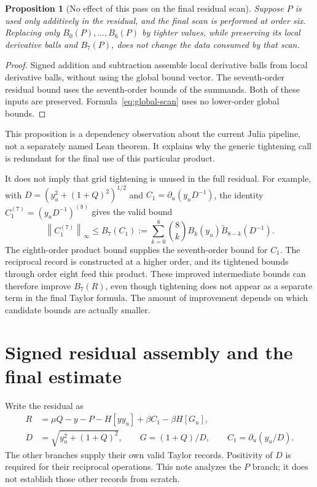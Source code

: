 \documentclass[11pt]{article}
\newtheorem{proposition}[theorem]{Proposition}
\theoremstyle{definition}
\theoremstyle{remark}
\newcommand{\norminf}[1]{\left\|#1\right\|_{\infty}}
\numberwithin{equation}{section}
\begin{document}
\begin{proposition}[No effect of this pass on the final residual scan]
\label{prop:no-effect}
Suppose $P$ is used only additively in the residual, and the final scan is
performed at order six. Replacing only $B_0(P),\ldots,B_6(P)$ by tighter
values, while preserving its local derivative balls and $B_7(P)$, does not
change the data consumed by that scan.
\end{proposition}
\begin{proof}
Signed addition and subtraction assemble local derivative balls from local
derivative balls, without using the global bound vector. The seventh-order
residual bound uses the seventh-order bounds of the summands. Both of these
inputs are preserved. Formula~\eqref{eq:global-scan} uses no lower-order
global bounds.
\end{proof}
This proposition is a dependency observation about the current Julia
pipeline, not a separately named Lean theorem. It explains why the generic
tightening call is redundant for the final use of this particular product.

It does not imply that grid tightening is unused in the full residual.
For example, with $D=(y_u^2+(1+Q)^2)^{1/2}$ and
$C_1=\partial_u(y_uD^{-1})$, the identity
$C_1^{(7)}=(y_uD^{-1})^{(8)}$ gives the valid bound
\begin{equation}
 \norminf{C_1^{(7)}}\leq B_7(C_1):=
 \sum_{k=0}^{8}\binom{8}{k}B_k(y_u)\widetilde B_{8-k}(D^{-1}).
 \label{eq:upstream-tightening}
\end{equation}
The eighth-order product bound supplies the seventh-order bound for
$C_1$. The reciprocal record
is constructed at a higher order, and its tightened bounds through order
eight feed this product. These improved intermediate bounds can therefore
improve $B_7(R)$, even though tightening does not appear as a separate term
in the final Taylor formula. The amount of improvement depends on which
candidate bounds are actually smaller.

\section{Signed residual assembly and the final estimate}
\label{sec:residual}

Write the residual as
\begin{align}
 R&=\mu Q-y-P-H[yy_u]+\beta C_1-\beta H[G_u],\label{eq:residual}\\
 D&=\sqrt{y_u^2+(1+Q)^2},\qquad
 G=(1+Q)/D,\qquad C_1=\partial_u(y_u/D).
\end{align}
The other branches supply their own valid Taylor records. Positivity of
$D$ is required for their reciprocal operations. This note analyzes the
$P$ branch; it does not establish those other records from scratch.
\end{document}
